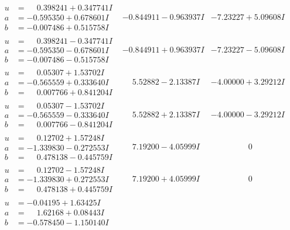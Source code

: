 \documentclass[1p]{elsarticle_modified}
\theoremstyle{definition}
\begin{document}
$$\begin{array}{c|c|c}
\begin{aligned}
u &= \phantom{-}0.398241 + 0.347741 I \\
a &= -0.595350 + 0.678601 I \\
b &= -0.007486 + 0.515758 I\end{aligned}
 & -0.844911 - 0.963937 I & -7.23227 + 5.09608 I \\ \hline\begin{aligned}
u &= \phantom{-}0.398241 - 0.347741 I \\
a &= -0.595350 - 0.678601 I \\
b &= -0.007486 - 0.515758 I\end{aligned}
 & -0.844911 + 0.963937 I & -7.23227 - 5.09608 I \\ \hline\begin{aligned}
u &= \phantom{-}0.05307 + 1.53702 I \\
a &= -0.565559 + 0.333640 I \\
b &= \phantom{-}0.007766 + 0.841204 I\end{aligned}
 & \phantom{-}5.52882 - 2.13387 I & -4.00000 + 3.29212 I \\ \hline\begin{aligned}
u &= \phantom{-}0.05307 - 1.53702 I \\
a &= -0.565559 - 0.333640 I \\
b &= \phantom{-}0.007766 - 0.841204 I\end{aligned}
 & \phantom{-}5.52882 + 2.13387 I & -4.00000 - 3.29212 I \\ \hline\begin{aligned}
u &= \phantom{-}0.12702 + 1.57248 I \\
a &= -1.339830 - 0.272553 I \\
b &= \phantom{-}0.478138 - 0.445759 I\end{aligned}
 & \phantom{-}7.19200 - 4.05999 I & \phantom{-0.000000 } 0 \\ \hline\begin{aligned}
u &= \phantom{-}0.12702 - 1.57248 I \\
a &= -1.339830 + 0.272553 I \\
b &= \phantom{-}0.478138 + 0.445759 I\end{aligned}
 & \phantom{-}7.19200 + 4.05999 I & \phantom{-0.000000 } 0 \\ \hline\begin{aligned}
u &= -0.04195 + 1.63425 I \\
a &= \phantom{-}1.62168 + 0.08443 I \\
b &= -0.578450 - 1.150140 I\end{aligned}

\end{array}$$
\end{document}
